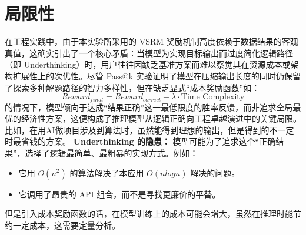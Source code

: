 \documentclass{article}
\begin{document}
\section{局限性}
在工程实践中，由于本实验所采用的 VSRM 奖励机制高度依赖于数据结果的客观真值，这确实引出了一个核心矛盾：当模型为实现目标输出而过度简化逻辑路径（即 Underthinking）时，用户往往因缺乏基准方案而难以察觉其在资源成本或架构扩展性上的次优性。尽管 Pass@k 实验证明了模型在压缩输出长度的同时仍保留了探索多种解题路径的智力多样性，但在缺乏显式“成本奖励函数”如：$$Reward_{final} = Reward_{correct} - \lambda \cdot \text{Time\_Complexity}$$的情况下，模型倾向于达成“结果正确”这一最低限度的胜率反馈，而非追求全局最优的经济性方案，这便构成了推理模型从逻辑正确向工程卓越演进中的关键局限。
比如，在用AI做项目涉及到算法时，虽然能得到理想的输出，但是得到的不一定时最省钱的方案。
\textbf{Underthinking 的隐患：} 模型可能为了追求这个“正确结果”，选择了逻辑最简单、最粗暴的实现方式。例如：
\begin{itemize}
    \item 它用 $O(n^2)$ 的算法解决了本应用 $O(n log n)$ 解决的问题。
    \item 它调用了昂贵的 API 组合，而不是寻找更廉价的平替。
\end{itemize}
但是引入成本奖励函数的话，在模型训练上的成本可能会增大，虽然在推理时能节约一定成本，这需要定量分析。
\end{document}
